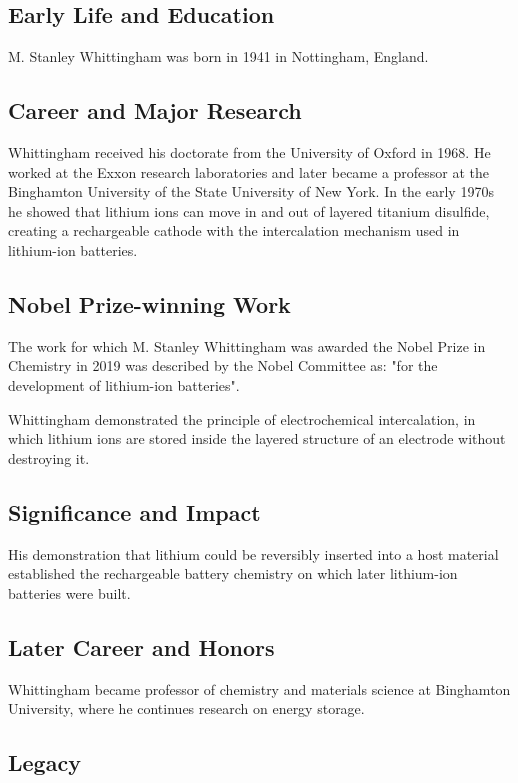 \subsection*{Early Life and Education}

M. Stanley Whittingham was born in 1941 in Nottingham, England.

\subsection*{Career and Major Research}

Whittingham received his doctorate from the University of Oxford in 1968. He worked at the Exxon research laboratories and later became a professor at the Binghamton University of the State University of New York. In the early 1970s he showed that lithium ions can move in and out of layered titanium disulfide, creating a rechargeable cathode with the intercalation mechanism used in lithium-ion batteries.

\subsection*{Nobel Prize-winning Work}

The work for which M. Stanley Whittingham was awarded the Nobel Prize in Chemistry in 2019 was described by the Nobel Committee as: "for the development of lithium-ion batteries".

Whittingham demonstrated the principle of electrochemical intercalation, in which lithium ions are stored inside the layered structure of an electrode without destroying it.

\subsection*{Significance and Impact}

His demonstration that lithium could be reversibly inserted into a host material established the rechargeable battery chemistry on which later lithium-ion batteries were built.

\subsection*{Later Career and Honors}

Whittingham became professor of chemistry and materials science at Binghamton University, where he continues research on energy storage.

\subsection*{Legacy}

